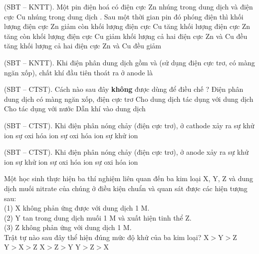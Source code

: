 \documentclass[11pt,a4paper]{article}
\def\loigiai#1{}
\begin{document}
\begin{ex}
(SBT -- KNTT). Một pin điện hoá có điện cực Zn nhúng trong dung dịch  và điện cực Cu nhúng trong dung dịch . Sau một thời gian pin đó phóng điện thì
\choice
{khối lượng điện cực Zn giảm còn khối lượng điện cực Cu tăng}
{khối lượng điện cực Zn tăng còn khối lượng điện cực Cu giảm}
{khối lượng cả hai điện cực Zn và Cu đều tăng}
{khối lượng cả hai điện cực Zn và Cu đều giảm}
\loigiai{}
\end{ex}

\newpage

\begin{ex}
(SBT -- KNTT). Khi điện phân dung dịch gồm  và  (sử dụng điện cực trơ, có màng ngăn xốp), chất khí đầu tiên thoát ra ở anode là
\choice
{}
{}
{}
{}
\loigiai{}
\end{ex}

\begin{ex}
(SBT -- CTST). Cách nào sau đây \textbf{không} được dùng để điều chế ?
\choice
{Điện phân dung dịch  có màng ngăn xốp, điện cực trơ}
{Cho dung dịch  tác dụng với dung dịch }
{Cho  tác dụng với nước}
{Dẫn khí  vào dung dịch }
\loigiai{}
\end{ex}

\begin{ex}
(SBT -- CTST). Khi điện phân  nóng chảy (điện cực trơ), ở cathode xảy ra
\choice
{sự khử ion }
{sự oxi hóa ion }
{sự oxi hóa ion }
{sự khử ion }
\loigiai{}
\end{ex}

\begin{ex}
(SBT -- CTST). Khi điện phân  nóng chảy (điện cực trơ), ở anode xảy ra
\choice
{sự khử ion }
{sự khử ion }
{sự oxi hóa ion }
{sự oxi hóa ion }
\loigiai{}
\end{ex}

\begin{ex}
Một học sinh thực hiện ba thí nghiệm liên quan đến ba kim loại X, Y, Z và dung dịch muối nitrate của chúng ở điều kiện chuẩn và quan sát được các hiện tượng sau:\\
(1) X không phản ứng được với dung dịch  1 M.\\
(2) Y tan trong dung dịch muối  1 M và xuất hiện tinh thể Z.\\
(3) Z không phản ứng với dung dịch  1 M.\\
Trật tự nào sau đây thể hiện đúng mức độ khử của ba kim loại?
\choice
{$\text{X} > \text{Y} > \text{Z}$}
{$\text{Y} > \text{X} > \text{Z}$}
{$\text{X} > \text{Z} > \text{Y}$}
{$\text{Y} > \text{Z} > \text{X}$}
\loigiai{}
\end{ex}
\end{document}
